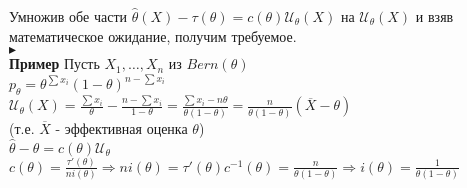 \documentclass{article}
\begin{document}
Умножив обе части $\widehat{\theta}(X) - \tau(\theta) = c(\theta)\mathcal{U}_\theta(X)$ на $\mathcal{U}_\theta(X)$ и взяв математическое ожидание, получим требуемое.\\
$\blacktriangleright$
\\
\textbf{Пример} Пусть $X_1,\dots,X_n$ из $Bern(\theta)$\\
$p_\theta = \theta^{\sum x_i}(1 - \theta)^{n - \sum x_i}$\\
$\mathcal{U}_\theta(X) = \frac{\sum x_i}{\theta}  - \frac{n - \sum x_i}{1 - \theta} = \frac{\sum x_i - n\theta}{\theta(1 - \theta)} = \frac{n}{\theta(1 - \theta)}(\overline{X} - \theta)$\\
(т.е. $\overline{X}$ - эффективная оценка $\theta$)\\
$\widehat{\theta} - \theta = c(\theta)\mathcal{U}_\theta$\\
$c(\theta) = \frac{\tau'(\theta)}{n i(\theta)} \Rightarrow n i(\theta) = \tau'(\theta)c^{-1}(\theta) = \frac{n}{\theta(1 - \theta)} \Rightarrow i(\theta) = \frac{1}{\theta(1 - \theta)}$
\end{document}
